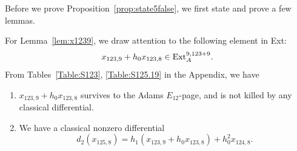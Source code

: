 



Before we prove Proposition~\ref{prop:state5false}, we first state and prove a few lemmas.

For Lemma~\ref{lem:x1239}, we draw attention to the following element in Ext:
$$x_{123,9}+h_0x_{123,8} \in \mathrm{Ext}_A^{9, 123+9}.$$
From Tables~\ref{Table:S123}, \ref{Table:S125.19} in the Appendix, we have
\begin{axiom} \label{fact:x1239}
    \begin{enumerate}

   \item  $x_{123,9}+h_0x_{123,8}$ survives to the Adams $E_{12}$-page, and is not killed by any classical differential.
    \item We have a classical nonzero differential 
    $$d_2 (x_{125,8}) = h_1 (x_{123,9}+h_0x_{123,8}) + h_0^2x_{124,8}.$$
   \end{enumerate}
\end{axiom}


